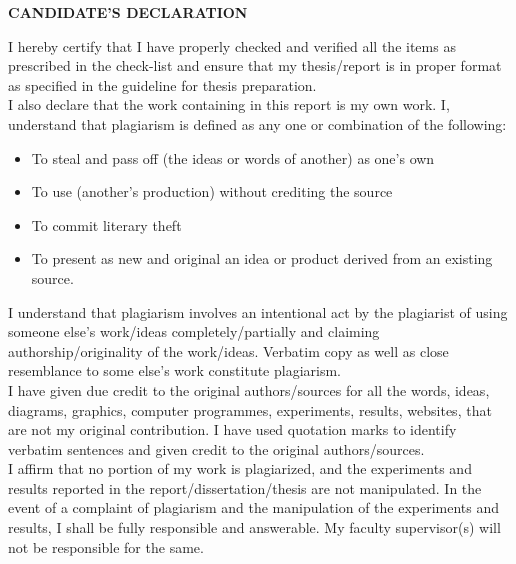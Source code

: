 \documentclass[12pt,a4paper]{article}
\newlength{\defbaselineskip}
\newcommand{\setlinespacing}[1]%
           {\setlength{\baselineskip}{#1 \defbaselineskip}}
\begin{document}
\newpage
\setcounter{page}{1}
\setlinespacing{1}
\begin{center}
{\large \bf CANDIDATE'S DECLARATION}
\end{center}
I hereby certify that I have properly checked and verified all the items as prescribed in the check-list and ensure that my thesis/report is in proper format as specified in the guideline for thesis preparation.\\

\noindent I also declare that the work containing in this report is my own work. I, understand that plagiarism is defined as any one or combination of the following:
\begin{itemize}
\item To steal and pass off (the ideas or words of another) as one's own
\item To use (another's production) without crediting the source
\item To commit literary theft
\item To present as new and original an idea or product derived from an existing source.
\end{itemize}
I understand that plagiarism involves an intentional act by the plagiarist of using someone else's work/ideas completely/partially and claiming authorship/originality of the work/ideas. Verbatim copy as well as close resemblance to some else's work constitute plagiarism.\\

\noindent I have given due credit to the original authors/sources for all the words, ideas, diagrams, graphics, computer programmes, experiments, results, websites, that are not my original contribution. I have used quotation marks to identify verbatim sentences and given credit to the original authors/sources.\\

\noindent I affirm that no portion of my work is plagiarized, and the experiments and results reported in the report/dissertation/thesis are not manipulated. In the event of a complaint of plagiarism and the manipulation of the experiments and results, I shall be fully responsible and answerable. My faculty supervisor(s) will not be responsible for the same.\vspace{1cm}\\
\end{document}
